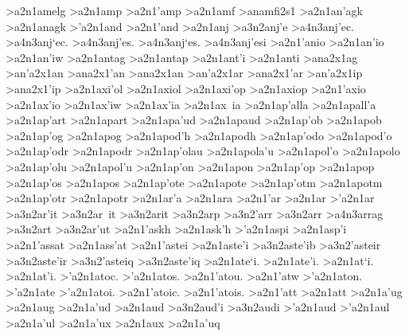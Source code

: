 {>a2n1amelg
>a2n1amp 		%
>a2n1'amp 		%
>a2n1amf 		%
>anamfi2s1 		%
>a2n1an'agk 		%
>a2n1anagk
>'a2n1and 		%
>a2n1'and
>a2n1anj 		%
	>a3n2anj'e 		%
		>a4n3anj'ec. 		%
		>a4n3anj`ec.
		>a4n3anj'es.
		>a4n3anj`es.
		>a4n3anj'esi
>a2n1'anio 		%
>a2n1an'io
>a2n1an'iw
>a2n1antag 		%
>a2n1antap 		%
>a2n1ant'i 		%
>a2n1anti
>ana2x1ag  		%
>an'a2x1an 		%
>ana2x1'an
>ana2x1an 		%
>an'a2x1ar	 	%
>ana2x1'ar
>an'a2x1ip  		%
>ana2x1'ip
>a2n1axi'ol   		%
>a2n1axiol
>a2n1axi'op  		%
>a2n1axiop
>a2n1'axio 		%
>a2n1ax'io
>a2n1ax'iw
>a2n1ax'ia
>a2n1ax~ia
>a2n1ap'alla 		%
>a2n1apall'a
>a2n1ap'art 		%
>a2n1apart
>a2n1apa'ud 		%
>a2n1apaud
>a2n1ap'ob 		%
>a2n1apob
>a2n1ap'og 		%
>a2n1apog
>a2n1apod'h 		%
>a2n1apodh
>a2n1ap'odo 		%
>a2n1apod'o
>a2n1ap'odr 		%
>a2n1apodr
>a2n1ap'olau 		%
>a2n1apola'u
>a2n1apol'o 		%
>a2n1apolo
>a2n1ap'olu 		%
>a2n1apol'u
>a2n1ap'on		%
>a2n1apon
>a2n1ap'op 		%
>a2n1apop
>a2n1ap'os 		%
>a2n1apos
>a2n1ap'ote 		%
>a2n1apote
>a2n1ap'otm 		%
>a2n1apotm
>a2n1ap'otr 		%
>a2n1apotr
>a2n1ar'a 		%
>a2n1ara
>a2n1'ar    		%
>a2n1ar
>'a2n1ar     		%
	>a3n2ar'it		%
	>a3n2ar~it		%
	>a3n2arit		%
	>a3n2arp		%
	>a3n2'arr 		%
	>a3n2arr
		>a4n3arrag 		%
	>a3n2art		%
	>a3n2ar'ut		%
>a2n1'askh 		%
>a2n1ask'h
>'a2n1aspi 		%
>a2n1asp'i
>a2n1'assat 		%
>a2n1ass'at
>a2n1'astei 		%
>a2n1aste'i
	>a3n2aste'ib    	%
	>a3n2'asteir		%
	>a3n2aste'ir
	>a3n2'asteiq		%
	>a3n2aste'iq
>a2n1ate`i. 		%
>a2n1ate'i.
>a2n1at`i. 		%
>a2n1at'i.
>'a2n1atoc.		%
>'a2n1atos.
>a2n1'atou.
>a2n1'atw
>'a2n1aton.
>'a2n1ate
>'a2n1atoi.
>a2n1'atoic.
>a2n1'atois.
>a2n1'att 		%
>a2n1att
>a2n1a'ug 		%
>a2n1aug
>a2n1a'ud 		%
>a2n1aud
	>a3n2aud'i 		%
	>a3n2audi
>'a2n1aud 		%
>'a2n1aul 		%
>a2n1a'ul
>a2n1a'ux 		%
>a2n1aux
>a2n1a'uq 		%
}
